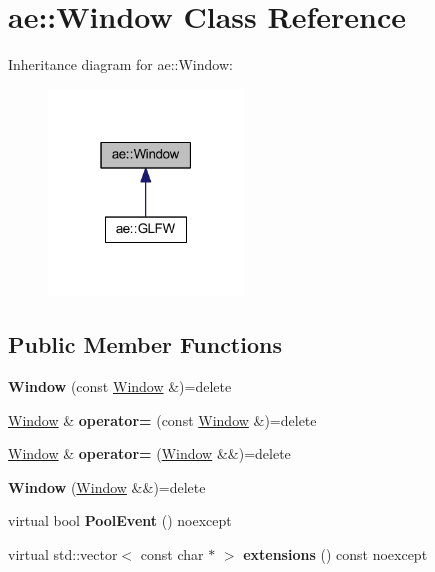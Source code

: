\hypertarget{classae_1_1_window}{}\section{ae\+:\+:Window Class Reference}
\label{classae_1_1_window}


Inheritance diagram for ae\+:\+:Window\+:\nopagebreak
\begin{figure}[H]
\begin{center}
\leavevmode
\includegraphics[width=147pt]{classae_1_1_window__inherit__graph}
\end{center}
\end{figure}
\subsection*{Public Member Functions}
\begin{DoxyCompactItemize}
\item 
\hypertarget{classae_1_1_window_aed0533cd4a633df7e42779eb3a6bafa6}{}\label{classae_1_1_window_aed0533cd4a633df7e42779eb3a6bafa6} 
{\bfseries Window} (const \hyperlink{classae_1_1_window}{Window} \&)=delete
\item 
\hypertarget{classae_1_1_window_a4cee2c65aa9028c2f540008c6d73ace0}{}\label{classae_1_1_window_a4cee2c65aa9028c2f540008c6d73ace0} 
\hyperlink{classae_1_1_window}{Window} \& {\bfseries operator=} (const \hyperlink{classae_1_1_window}{Window} \&)=delete
\item 
\hypertarget{classae_1_1_window_a27055c3b7bd792501f9fb94cc8fd898b}{}\label{classae_1_1_window_a27055c3b7bd792501f9fb94cc8fd898b} 
\hyperlink{classae_1_1_window}{Window} \& {\bfseries operator=} (\hyperlink{classae_1_1_window}{Window} \&\&)=delete
\item 
\hypertarget{classae_1_1_window_a4f08ce502de00e126f730e2121691658}{}\label{classae_1_1_window_a4f08ce502de00e126f730e2121691658} 
{\bfseries Window} (\hyperlink{classae_1_1_window}{Window} \&\&)=delete
\item 
\hypertarget{classae_1_1_window_a073b038d68804c5deeec8c9b2a9f2de2}{}\label{classae_1_1_window_a073b038d68804c5deeec8c9b2a9f2de2} 
virtual bool {\bfseries Pool\+Event} () noexcept
\item 
\hypertarget{classae_1_1_window_a64aeae1efc86ce9e502233ad8fae090b}{}\label{classae_1_1_window_a64aeae1efc86ce9e502233ad8fae090b} 
virtual std\+::vector$<$ const char $\ast$ $>$ {\bfseries extensions} () const noexcept
\end{DoxyCompactItemize}
